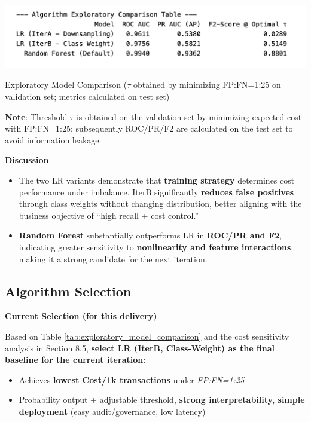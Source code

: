\documentclass[sigplan,screen]{acmart}
\begin{document}
\begin{table}[h!]
    \centering
    \includegraphics[width=0.9\columnwidth]{6.1.png}
    \caption{Exploratory Model Comparison ($\tau$ obtained by minimizing FP:FN=1:25 on validation set; metrics calculated on test set)}
    \label{tab:exploratory_model_comparison}
\end{table}

\textbf{Note}: Threshold $\tau$ is obtained on the validation set by minimizing expected cost with FP:FN=1:25; subsequently ROC/PR/F2 are calculated on the test set to avoid information leakage.

\textbf{Discussion}

\begin{itemize}
\item The two LR variants demonstrate that \textbf{training strategy} determines cost performance under imbalance. IterB significantly \textbf{reduces false positives} through class weights without changing distribution, better aligning with the business objective of ``high recall + cost control.''
\item \textbf{Random Forest} substantially outperforms LR in \textbf{ROC/PR and F2}, indicating greater sensitivity to \textbf{nonlinearity and feature interactions}, making it a strong candidate for the next iteration.
\end{itemize}

\subsection{Algorithm Selection}

\textbf{Current Selection (for this delivery)}

Based on Table \ref{tab:exploratory_model_comparison} and the cost sensitivity analysis in Section 8.5, \textbf{select LR (IterB, Class-Weight) as the final baseline for the current iteration}:

\begin{itemize}
\item Achieves \textbf{lowest Cost/1k transactions} under \textit{FP:FN=1:25}
\item Probability output + adjustable threshold, \textbf{strong interpretability, simple deployment} (easy audit/governance, low latency)
\end{itemize}
\end{document}
